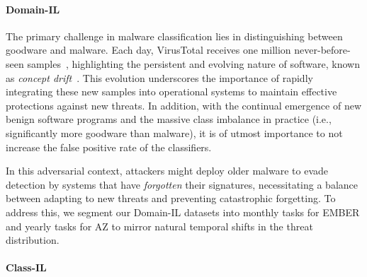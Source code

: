 \paragraph{Domain-IL}
The primary challenge in malware classification lies in distinguishing between goodware and malware. Each day, VirusTotal receives one million never-before-seen samples~\cite{virustotal}, highlighting the persistent and evolving nature of software, known as \emph{concept drift}~\cite{chen2023continuous}. This evolution underscores the importance of rapidly integrating these new samples into operational systems to maintain effective protections against new threats. In addition, with the continual emergence of new benign software programs and the massive class imbalance in practice (i.e., significantly more goodware than malware), it is of utmost importance to not increase the false positive rate of the classifiers.

In this adversarial context, attackers might deploy older malware to evade detection by systems that have {\em forgotten} their signatures, necessitating a balance between adapting to new threats and preventing catastrophic forgetting. To address this, we segment our Domain-IL datasets into monthly tasks for EMBER and yearly tasks for AZ to mirror natural temporal shifts in the threat distribution.



\paragraph{Class-IL} 

